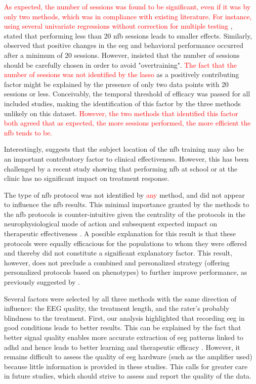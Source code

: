 \textcolor{red}{As expected, the number of sessions was found to be significant, even if it was by only two methods, which was in compliance with existing literature}.
\textcolor{red}{For instance, using several univariate regressions without correction for multiple testing} \citet{Arns2009}, 
\citet{Arns2014} stated that performing less than 20 \gls{nfb} sessions leads to smaller effects. Similarly, \citet{Vernon2004} 
observed that positive changes in the \gls{eeg} and behavioral performance occurred after a minimum of 20 sessions. However, \citet{Enriquez2017} 
insisted that the number of sessions should be carefully chosen in order to avoid "overtraining". \textcolor{red}{The fact that the number of sessions was not 
identified by the \gls{lasso}} as a positively contributing factor might be explained by the presence of only two data points with 20 sessions or less. 
Conceivably, the temporal threshold of efficacy was passed for all included studies, making the identification of this factor by the three methods unlikely on 
this dataset. \textcolor{red}{However, the two methods that identified this factor both agreed that as expected, the more sessions performed, 
the more efficient the \gls{nfb} tends to be.}

Interestingly, \citep{Minder2018} suggests that the subject location of the \gls{nfb} training may also be an important contributory 
factor to clinical effectiveness. However, this has been challenged by a recent study \citep{Minder2018} showing that 
performing \gls{nfb} at school or at the clinic has no significant impact on treatment response. 

The type of \gls{nfb} protocol was not identified by \textcolor{red}{any} method, and did not appear to influence the \gls{nfb} results. 
This minimal importance granted by the methods to the \gls{nfb} protocols is counter-intuitive given the centrality of the 
protocols in the neurophysiological mode of action and subsequent expected impact on
therapeutic effectiveness \citep{Vernon2004}. A possible explanation for this result is that these protocols were equally 
efficacious for the populations to whom they were offered and thereby did not constitute a significant explanatory factor. 
This result, however, does not preclude a combined and personalized strategy (offering personalized protocols based on phenotypes)
to further improve performance, as previously suggested by \citet{Alkoby2017}.

Several factors were selected by all three methods with the same direction of influence: the EEG quality, the treatment 
length, and the rater's probably blindness to the treatment. First, our analysis highlighted that recording \gls{eeg} 
in good conditions leads to better results.
This can be explained by the fact that better signal quality enables more accurate extraction of \gls{eeg} patterns
linked to \gls{adhd} and hence leads to better learning and therapeutic efficacy \citep{Congedo2004}. 
However, it remains difficult to assess the quality of \gls{eeg} hardware (such as the amplifier used) 
because little information is provided in these studies.  
This calls for greater care in future studies, which should strive to assess and report the quality of the data.

